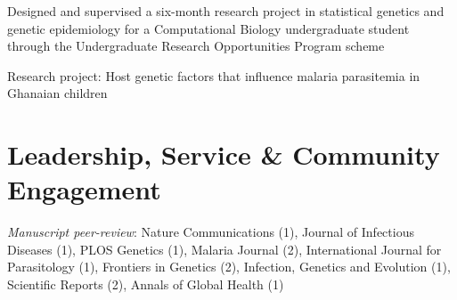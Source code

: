 \documentclass[11pt,a4paper,]{awesome-cv}
\begin{document}
\begin{cventries}
{\begin{cvitems}
\item Designed and supervised a six-month research project in statistical genetics and genetic epidemiology for a Computational Biology undergraduate student through the Undergraduate Research Opportunities Program scheme
\item Research project: Host genetic factors that influence malaria parasitemia in Ghanaian children
\end{cvitems}}
\end{cventries}

\hypertarget{leadership-service-community-engagement}{%
\section{Leadership, Service \& Community
Engagement}\label{leadership-service-community-engagement}}

\footnotesize

\emph{Manuscript peer-review}: Nature Communications (1), Journal of
Infectious Diseases (1), PLOS Genetics (1), Malaria Journal (2),
International Journal for Parasitology (1), Frontiers in Genetics (2),
Infection, Genetics and Evolution (1), Scientific Reports (2), Annals of
Global Health (1) \normalsize
\end{document}
